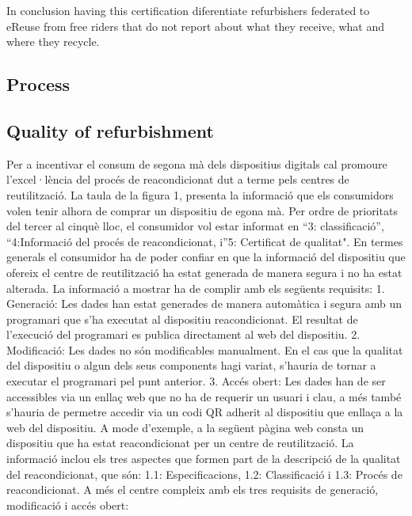 \documentclass[
]{book}
\begin{document}
In conclusion having this certification diferentiate refurbishers federated to eReuse from free riders that do not report about what they receive, what and where they recycle.

\hypertarget{process}{%
\subsection{Process}\label{process}}

\hypertarget{quality-of-refurbishment}{%
\subsection{Quality of refurbishment}\label{quality-of-refurbishment}}

Per a incentivar el consum de segona mà dels dispositius digitals cal promoure l'excel·lència del procés de reacondicionat dut a terme pels centres de reutilització. La taula de la figura 1, presenta la informació que els consumidors volen tenir alhora de comprar un dispositiu de egona mà. Per ordre de prioritats del tercer al cinquè lloc, el consumidor vol estar informat en ``3: classificació'', ``4:Informació del procés de reacondicionat, i''5: Certificat de qualitat". En termes generals el consumidor ha de poder confiar en que la informació del dispositiu que ofereix el centre de reutilització ha estat generada de manera segura i no ha estat alterada. La informació a mostrar ha de complir amb els següents requisits: 1. Generació: Les dades han estat generades de manera automàtica i segura amb un programari que s'ha executat al dispositiu reacondicionat. El resultat de l'execució del programari es publica directament al web del dispositiu. 2. Modificació: Les dades no són modificables manualment. En el cas que la qualitat del dispositiu o algun dels seus components hagi variat, s'hauria de tornar a executar el programari pel punt anterior. 3. Accés obert: Les dades han de ser accessibles via un enllaç web que no ha de requerir un usuari i clau, a més també s'hauria de permetre accedir via un codi QR adherit al dispositiu que enllaça a la web del dispositiu. A mode d'exemple, a la següent pàgina web consta un dispositiu que ha estat reacondicionat per un centre de reutilització. La informació inclou els tres aspectes que formen part de la descripció de la qualitat del reacondicionat, que són: 1.1: Especificacions, 1.2: Classificació i 1.3: Procés de reacondicionat. A més el centre compleix amb els tres requisits de generació, modificació i accés obert:
\end{document}
